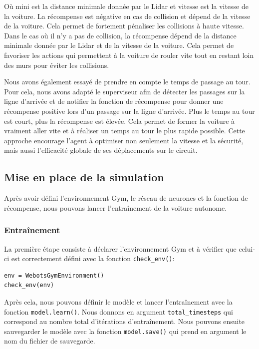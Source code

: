 \documentclass[french]{article}
\begin{document}
Où $\text{mini}$ est la distance minimale donnée par le Lidar et $\text{vitesse}$ est la vitesse de la voiture.
La récompense est négative en cas de collision et dépend de la vitesse de la voiture. Cela permet de fortement pénaliser
les collisions à haute vitesse. Dans le cas où il n'y a pas de collision, la récompense dépend de la distance minimale
donnée par le Lidar et de la vitesse de la voiture. Cela permet de favoriser les actions qui permettent à la voiture
de rouler vite tout en restant loin des murs pour éviter les collisions.

\vspace{0.5cm}
Nous avons également essayé de prendre en compte le temps de passage au tour. Pour cela, nous avons adapté le 
superviseur afin de détecter les passages sur la ligne d'arrivée et de notifier la fonction de récompense pour 
donner une récompense positive lors d'un passage sur la ligne d'arrivée. Plus le temps au tour est court, plus 
la récompense est élevée. Cela permet de former la voiture à vraiment aller vite et à réaliser un temps au tour 
le plus rapide possible. Cette approche encourage l'agent à optimiser non seulement la vitesse et la sécurité, 
mais aussi l'efficacité globale de ses déplacements sur le circuit.


\subsection{Mise en place de la simulation}
Après avoir défini l'environnement Gym, le réseau de neurones et la fonction de récompense, nous pouvons lancer
l'entraînement de la voiture autonome.

\subsubsection*{Entraînement}
La première étape consiste à déclarer l'environnement Gym et à vérifier que celui-ci est correctement défini avec 
la fonction \texttt{check\_env()}:

\begin{verbatim}
env = WebotsGymEnvironment()
check_env(env)
\end{verbatim}

Après cela, nous pouvons définir le modèle et lancer l'entraînement avec la fonction \texttt{model.learn()}. Nous 
donnons en argument \texttt{total\_timesteps} qui correspond au nombre total d'itérations d'entraînement. Nous 
pouvons ensuite sauvegarder le modèle avec la fonction \texttt{model.save()} qui prend en argument le nom du fichier
de sauvegarde.
\end{document}
